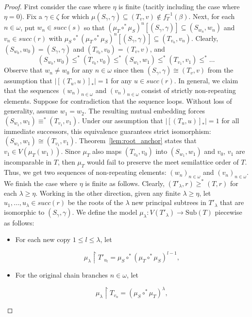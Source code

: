 \documentclass[10pt,a4paper]{amsart}
\begin{document}
\begin{proof}
First consider the case where $\eta$ is finite (tacitly including the case where $\eta = 0$). Fix a $\gamma \in \zeta$ for which $\mu(S_\gamma,\gamma) \subseteq (T_v,v)\not \in f_T^{-1}(\beta)$. Next, for each $n\in \omega$, put $w_n \in succ(s)$ so that $(\mu_T\circ^*\mu_S)^n[(S_\gamma,\gamma)] \subseteq (S_{w_n}, w_n)$ and $v_n\in succ(r)$ with $\mu_S\circ^*(\mu_T\circ^*\mu_S)^n[(S_\gamma,\gamma)] \subseteq (T_{v_n}, v_n)$. Clearly, $(S_{w_0},w_0) = (S_\gamma,\gamma)$ and $(T_{v_0}, v_0) = (T_v, v)$, and 
\[
(S_{w_0},w_0) \leq^* (T_{v_0},v_0) \leq^*(S_{w_1},w_1) \leq^*(T_{v_1},v_1) \leq^* \ldots
\]
 Observe that $w_n \not = w_0$ for any $n\in \omega$ since then $(S_\gamma, \gamma) \cong (T_v,v)$ from the assumption that $|[(T_u, u)]_*| =1$ for any $u \in succ(r)$. In general, we claim that the sequences $(w_n)_{n \in \omega}$ and $(v_n)_{n \in \omega}$ consist of strictly non-repeating elements. Suppose for contradiction that the sequence loops. Without loss of generality, assume $w_1 = w_2$. The resulting mutual embedding forces $(S_{w_1}, w_1) \equiv^* (T_{v_1}, v_1)$. Under our assumption that $|[(T_u, u)]_*| = 1$ for all immediate successors, this equivalence guarantees strict isomorphism: $(S_{w_1}, w_1) \cong (T_{v_1}, v_1)$. Theorem~\ref{lem:root_anchor} states that $v_1 \in V(\mu_T(w_1))$. Since $\mu_T$ also maps $(T_{v_0},v_0)$ into $(S_{w_1}, w_1)$ and $v_0$, $v_1$ are incomparable in $T$, then $\mu_T$ would fail to preserve the meet semilattice order of $T$. Thus, we get two sequences of non-repeating elements: $(w_n)_{n\in\omega}$ and $(v_n)_{n\in\omega}$. \\

\noindent
We finish the case where $\eta$ is finite as follows. Clearly, $(T'_{\lambda}, r) \geq^* (T,r)$ for each $\lambda \geq \eta$. Working in the other direction, given any finite $\lambda \geq \eta$, let $u_1, \dots, u_\lambda \in succ(r)$ be the roots of the $\lambda$ new principal subtrees in $T'_\lambda$ that are isomorphic to $(S_\gamma, \gamma)$. We define the model $\mu_\lambda: V(T'_{\lambda}) \to \text{Sub}(T)$ piecewise as follows:
\begin{itemize}
\item For each new copy $1 \leq l \leq \lambda$, let 

\[
\mu_\lambda \restriction T'_{u_l} = \mu_S \circ^* (\mu_T \circ^* \mu_S)^{l-1},
\]

\item For the original chain branches $n \in \omega$, let 

\[
\mu_\lambda \restriction T_{v_n} = (\mu_S \circ^* \mu_T)^{\lambda},
\]


\end{itemize}
\end{proof}
\end{document}
